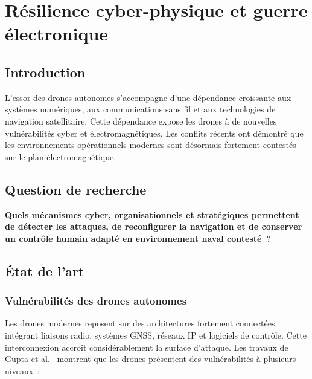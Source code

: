 \documentclass[12pt, a4paper, twoside, openright]{report}
\begin{document}
\cleardoublepage

\chapter{Résilience cyber-physique et guerre électronique}\label{chap:axe3}

\section{Introduction}

L'essor des drones autonomes s'accompagne d'une dépendance croissante aux systèmes numériques, aux communications sans fil et aux technologies de navigation satellitaire. Cette dépendance expose les drones à de nouvelles vulnérabilités cyber et électromagnétiques. Les conflits récents ont démontré que les environnements opérationnels modernes sont désormais fortement contestés sur le plan électromagnétique.

\section{Question de recherche}

\begin{mdframed}[backgroundcolor=blue!5, linewidth=1.5pt, linecolor=blue]
\textbf{Quels mécanismes cyber, organisationnels et stratégiques permettent de détecter les attaques, de reconfigurer la navigation et de conserver un contrôle humain adapté en environnement naval contesté~?}
\end{mdframed}

\section{État de l'art}

\subsection{Vulnérabilités des drones autonomes}

Les drones modernes reposent sur des architectures fortement connectées intégrant liaisons radio, systèmes GNSS, réseaux IP et logiciels de contrôle. Cette interconnexion accroît considérablement la surface d'attaque. Les travaux de Gupta et al.~\cite{gupta2020cyber} montrent que les drones présentent des vulnérabilités à plusieurs niveaux~:
\end{document}
